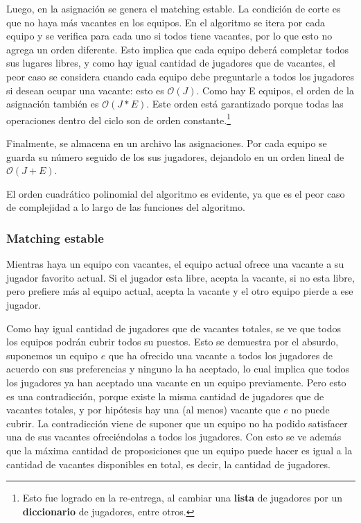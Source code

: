 \documentclass[article,a4paper]{article}
\newcommand{\bigO}{\mathcal{O}}
\begin{document}
Luego, en la asignación se genera el matching estable. La condición de corte es que no haya más vacantes en los equipos. En el algoritmo se itera por cada equipo y se verifica para cada uno si todos tiene vacantes, por lo que esto no agrega un orden diferente. Esto implica que cada equipo deberá completar todos sus lugares libres, y como hay igual cantidad de jugadores que de vacantes, el peor caso se considera cuando cada equipo debe preguntarle a todos los jugadores si desean ocupar una vacante: esto es $\bigO(J)$. Como hay E equipos, el orden de la asignación también es $\bigO(J*E)$. Este orden está garantizado porque todas las operaciones dentro del ciclo son de orden constante.\footnote{Esto fue logrado en la re-entrega, al cambiar una \textbf{lista} de jugadores por un \textbf{diccionario} de jugadores, entre otros.}



Finalmente, se almacena en un archivo las asignaciones. Por cada equipo se guarda su número seguido de los sus jugadores, dejandolo en un orden lineal de $\bigO(J+E)$.

El orden cuadrático polinomial del algoritmo es evidente, ya que es el peor caso de complejidad a lo largo de las funciones del algoritmo.

\subsubsection{Matching estable}

Mientras haya un equipo con vacantes, el equipo actual ofrece una vacante a su jugador favorito actual. Si el jugador esta libre, acepta la vacante, si no esta libre, pero prefiere más al equipo actual, acepta la vacante y el otro equipo pierde a ese jugador.

Como hay igual cantidad de jugadores que de vacantes totales, se ve que todos los equipos podrán cubrir todos su puestos. Esto se demuestra por el absurdo, suponemos un equipo $e$ que ha ofrecido una vacante a todos los jugadores de acuerdo con sus preferencias y ninguno la ha aceptado, lo cual implica que todos los jugadores ya han aceptado una vacante en un equipo previamente. Pero esto es una contradicción, porque existe la misma cantidad de jugadores que de vacantes totales, y por hipótesis hay una (al menos) vacante que $e$ no puede cubrir. La contradicción viene de suponer que un equipo no ha podido satisfacer una de sus vacantes ofreciéndolas a todos los jugadores. Con esto se ve además que la máxima cantidad de proposiciones que un equipo puede hacer es igual a la cantidad de vacantes disponibles en total, es decir, la cantidad de jugadores.
\end{document}
